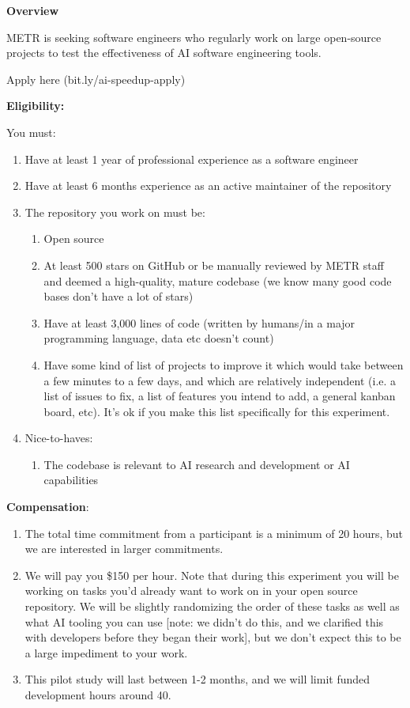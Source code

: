 \documentclass{article}
\begin{document}
\begin{instructionbox}

\textbf{Overview}

METR is seeking software engineers who regularly work on large open-source projects to test the effectiveness of AI software engineering tools.
    
Apply here (bit.ly/ai-speedup-apply)

\textbf{Eligibility:}

You must:
\begin{enumerate}
    \item Have at least 1 year of professional experience as a software engineer
    \item Have at least 6 months experience as an active maintainer of the repository
    \item The repository you work on must be:
    \begin{enumerate}
        \item Open source
        \item At least 500 stars on GitHub or be manually reviewed by METR staff and deemed a high-quality, mature codebase (we know many good code bases don’t have a lot of stars)
        \item Have at least 3,000 lines of code (written by humans/in a major programming language, data etc doesn’t count)
        \item Have some kind of list of projects to improve it which would take between a few minutes to a few days, and which are relatively independent (i.e. a list of issues to fix, a list of features you intend to add, a general kanban board, etc). It’s ok if you make this list specifically for this experiment.
    \end{enumerate}
    \item Nice-to-haves:
    \begin{enumerate}
        \item The codebase is relevant to AI research and development or AI capabilities
    \end{enumerate}
\end{enumerate}


\textbf{Compensation}: 
\begin{enumerate}
    \item The total time commitment from a participant is a minimum of 20 hours, but we are interested in larger commitments. 
    \item We will pay you \$150 per hour. Note that during this experiment you will be working on tasks you’d already want to work on in your open source repository. We will be slightly randomizing the order of these tasks as well as what AI tooling you can use [note: we didn't do this, and we clarified this with developers before they began their work], but we don’t expect this to be a large impediment to your work. 
    \item This pilot study will last between 1-2 months, and we will limit funded development hours around 40.
\end{enumerate}


\end{instructionbox}
\end{document}
